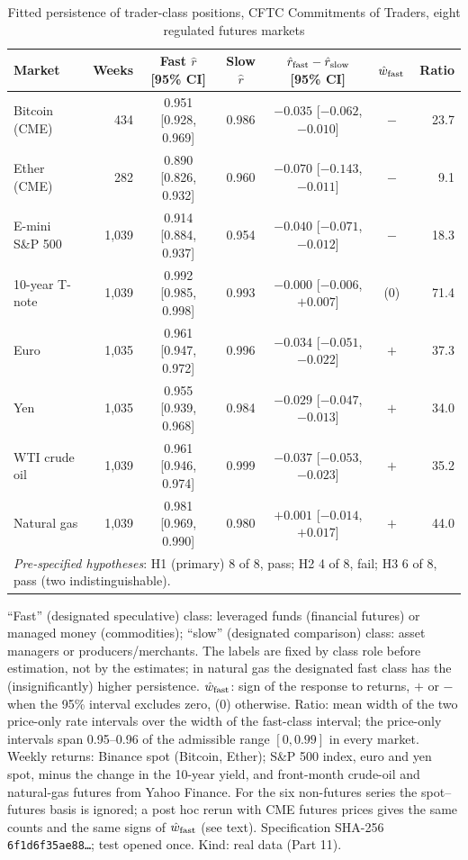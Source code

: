 \begin{table}[t]\centering\small
\begin{threeparttable}
\caption{Fitted persistence of trader-class positions, CFTC Commitments of Traders, eight regulated futures markets}\label{tab:cot}
\setlength{\tabcolsep}{2.2pt}\footnotesize
\begin{tabular}{lrccccr}
\toprule
Market & Weeks & Fast $\hat r$ [95\% CI] & Slow $\hat r$ & $\hat r_{\rm fast}-\hat r_{\rm slow}$ [95\% CI] & $\hat w_{\rm fast}$ & Ratio\\
\midrule
Bitcoin (CME) & 434 & 0.951 [0.928, 0.969] & 0.986 & $-0.035$ [$-0.062$, $-0.010$] & $-$ & 23.7\\
Ether (CME) & 282 & 0.890 [0.826, 0.932] & 0.960 & $-0.070$ [$-0.143$, $-0.011$] & $-$ & 9.1\\
E-mini S\&P 500 & 1{,}039 & 0.914 [0.884, 0.937] & 0.954 & $-0.040$ [$-0.071$, $-0.012$] & $-$ & 18.3\\
10-year T-note & 1{,}039 & 0.992 [0.985, 0.998] & 0.993 & $-0.000$ [$-0.006$, $+0.007$] & (0) & 71.4\\
Euro & 1{,}035 & 0.961 [0.947, 0.972] & 0.996 & $-0.034$ [$-0.051$, $-0.022$] & $+$ & 37.3\\
Yen & 1{,}035 & 0.955 [0.939, 0.968] & 0.984 & $-0.029$ [$-0.047$, $-0.013$] & $+$ & 34.0\\
WTI crude oil & 1{,}039 & 0.961 [0.946, 0.974] & 0.999 & $-0.037$ [$-0.053$, $-0.023$] & $+$ & 35.2\\
Natural gas & 1{,}039 & 0.981 [0.969, 0.990] & 0.980 & $+0.001$ [$-0.014$, $+0.017$] & $+$ & 44.0\\
\midrule
\multicolumn{7}{l}{\emph{Pre-specified hypotheses}: H1 (primary) 8 of 8, pass; H2 4 of 8, fail; H3 6 of 8, pass (two indistinguishable).}\\
\bottomrule
\end{tabular}
\begin{tablenotes}\footnotesize\item ``Fast'' (designated speculative) class: leveraged funds (financial futures) or managed money (commodities); ``slow'' (designated comparison) class: asset managers or producers/merchants. The labels are fixed by class role before estimation, not by the estimates; in natural gas the designated fast class has the (insignificantly) higher persistence. $\hat w_{\rm fast}$: sign of the response to returns, $+$ or $-$ when the 95\% interval excludes zero, (0) otherwise. Ratio: mean width of the two price-only rate intervals over the width of the fast-class interval; the price-only intervals span 0.95--0.96 of the admissible range $[0,0.99]$ in every market. Weekly returns: Binance spot (Bitcoin, Ether); S\&P 500 index, euro and yen spot, minus the change in the 10-year yield, and front-month crude-oil and natural-gas futures from Yahoo Finance. For the six non-futures series the spot--futures basis is ignored; a post hoc rerun with CME futures prices gives the same counts and the same signs of $\hat w_{\rm fast}$ (see text). Specification SHA-256 \texttt{6f1d6f35ae88\ldots}; test opened once. Kind: real data (Part 11).\end{tablenotes}
\end{threeparttable}
\end{table}


